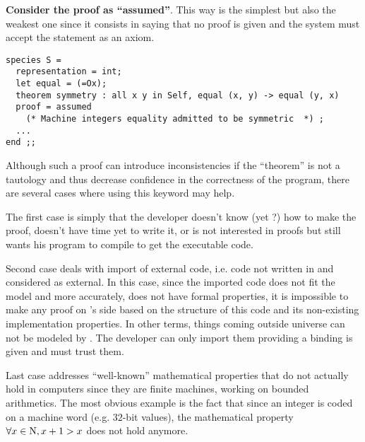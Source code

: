 \begin{compact-itemize}
\item {\bf Consider the proof as ``assumed''}. This way is the
  simplest but also the weakest one since it consists in saying that
  no proof is given and the system must accept the statement as an axiom.

  {\scriptsize
\begin{lstlisting}
species S =
  representation = int;
  let equal = (=Ox);
  theorem symmetry : all x y in Self, equal (x, y) -> equal (y, x)
  proof = assumed
    (* Machine integers equality admitted to be symmetric  *) ;
  ...
end ;;
\end{lstlisting}
}

Although such a proof can introduce inconsistencies if the
``theorem'' is not a tautology and thus decrease confidence in the
correctness of the {\focal} program, there are several cases where
using this keyword may help.
  \begin{compact-itemize}
      \item The first case is simply that the developer doesn't know
        (yet ?) how to make the proof, doesn't have time yet to write
        it, or is not interested in proofs but still wants his program to
        compile to get the executable code.

      \item Second case deals with import of external code, i.e. code
        not written in {\focal} and considered as external. In this
        case, since the imported code does not fit the {\focal} model
        and more accurately, does not have formal properties, it is
        impossible to make any proof on {\focal}'s side based on the
        structure of this code and its non-existing implementation
        properties. In other terms, things coming outside {\focal}
        universe can not be modeled by {\focal}. The developer can only
        import them providing a binding is given and must trust them.

      \item Last case addresses ``well-known'' mathematical properties
        that do not actually hold in computers since they are finite
        machines, working on bounded arithmetics. The most obvious
        example is the fact that since an integer is coded on a
        machine word (e.g. $32$-bit values), the
        mathematical property $\forall x \in \mbox{\cal{N}}, x + 1 >
        x$ does not hold anymore.


\end{compact-itemize}
\end{compact-itemize}
